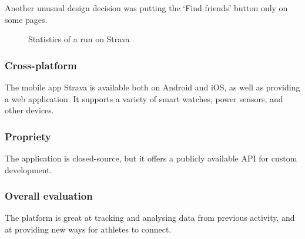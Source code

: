 Another unusual design decision was putting the `Find friends' button only on some pages.

\begin{figure}[h]
    \centering
    \caption{Statistics of a run on Strava \cite{strava-run-stats-img}}
    \label{strava-run-stats-img}
\end{figure}

\subsubsection*{Cross-platform}
The mobile app Strava is available both on Android and iOS, as well as providing a web application.
It supports a variety of smart watches, power sensors, and other devices.
\subsubsection*{Propriety}
The application is closed-source, but it offers a publicly available API for custom development.
\subsubsection*{Overall evaluation}
The platform is great at tracking and analysing data from previous activity, and at providing new ways for athletes to connect.
